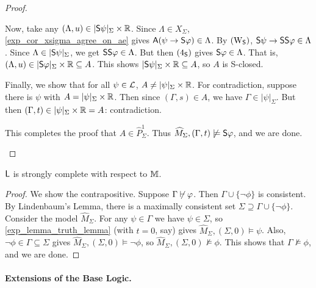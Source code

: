 \begin{proof}
\begin{itemize}
    Now, take any $(\Lambda, u) \in |\S\psi|_\Sigma \times \R$.
    Since $\Lambda \in X_\Sigma$, \cref{exp_cor_xsigma_agree_on_ae} gives
    $\A(\psi \limplies \S\phi) \in \Lambda$. By $\weakeningS$,
    $\S\psi \limplies \S\S\phi \in \Lambda$. Since $\Lambda \in
    |\S\psi|_\Sigma$, we get $\S\S\phi \in \Lambda$. But then
    $\foursoundness$ gives $\S\phi \in \Lambda$. That is, $(\Lambda,
    u) \in |\S\phi|_\Sigma \times \R \subseteq A$. This shows
    $|\S\psi|_\Sigma \times \R \subseteq A$, so $A$ is
    S-closed.

    Finally, we show that for all $\psi \in \cL$, $A \ne
    |\psi|_\Sigma \times \R$.  For contradiction, suppose there is
    $\psi$ with $A = |\psi|_\Sigma \times \R$. Then since $(\Gamma,
    s) \in A$, we have $\Gamma \in |\psi|_\Sigma$. But then $(\Gamma,
    t) \in |\psi|_\Sigma \times \R = A$: contradiction.

    This completes the proof that $A \in \widehat{P}_\Sigma^1$.  Thus
    $\widehat{M}_\Sigma, (\Gamma, t) \not\models \S\phi$, and we are done.
    \end{itemize}
\end{proof}

\begin{theorem}
\label{exp_thm_strong_completeness}
    $\sL$ is strongly complete\footnotemark{} with respect to $\M$.
\end{theorem}


\begin{proof}
We show the contrapositive. Suppose $\Gamma \not\entails \phi$.
Then $\Gamma \cup \{\neg\phi\}$ is consistent. By Lindenbaum's
Lemma, there is a maximally consistent set $\Sigma \supseteq \Gamma
\cup \{\neg\phi\}$. Consider the model $\widehat{M}_\Sigma$. For
any $\psi \in \Gamma$ we have $\psi \in \Sigma$, so
\cref{exp_lemma_truth_lemma} (with $t = 0$, say) gives
$\widehat{M}_\Sigma, (\Sigma, 0) \models \psi$. Also,
$\neg\phi \in \Gamma \subseteq \Sigma$ gives
$\widehat{M}_\Sigma, (\Sigma, 0) \models \neg\phi$, so
$\widehat{M}_\Sigma, (\Sigma, 0) \not\models \phi$. This shows that
$\Gamma \not\models \phi$, and we are done.
\end{proof}

\paragraph{Extensions of the Base Logic.}


